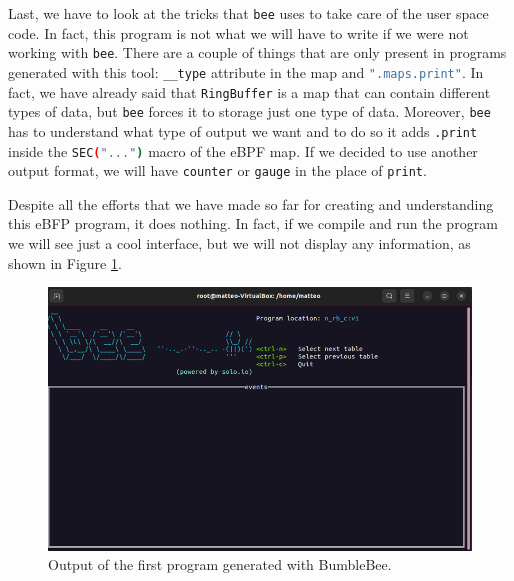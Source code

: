 Last, we have to look at the tricks that \colorbox{backcolour}{\lstinline[style=commandline, language=bash, breaklines=true]|bee|} uses to take care of the user space code.
In fact, this program is not what we will have to write if we were not working with \colorbox{backcolour}{\lstinline[style=commandline, language=bash, breaklines=true]|bee|}.
There are a couple of things that are only present in programs generated with this tool: \colorbox{backcolour}{\lstinline[style=commandline, language=bash, breaklines=true]|__type|} attribute in the map and \colorbox{backcolour}{\lstinline[style=commandline, language=bash, breaklines=true]|".maps.print"|}.
In fact, we have already said that \colorbox{backcolour}{\lstinline[style=commandline, language=bash, breaklines=true]|RingBuffer|} is a map that can contain different types of data, but \colorbox{backcolour}{\lstinline[style=commandline, language=bash, breaklines=true]|bee|} forces it to storage just one type of data.
Moreover, \colorbox{backcolour}{\lstinline[style=commandline, language=bash, breaklines=true]|bee|} has to understand what type of output we want and to do so it adds \colorbox{backcolour}{\lstinline[style=commandline, language=bash, breaklines=true]|.print|} inside the \colorbox{backcolour}{\lstinline[style=commandline, language=bash, breaklines=true]|SEC("...")|} macro of the eBPF map.
If we decided to use another output format, we will have \colorbox{backcolour}{\lstinline[style=commandline, language=bash, breaklines=true]|counter|} or \colorbox{backcolour}{\lstinline[style=commandline, language=bash, breaklines=true]|gauge|} in the place of \colorbox{backcolour}{\lstinline[style=commandline, language=bash, breaklines=true]|print|}.

Despite all the efforts that we have made so far for creating and understanding this eBFP program, it does nothing.
In fact, if we compile and run the program we will see just a cool interface, but we will not display any information, as shown in Figure \ref{fig:bee_first_program_output}.

\begin{figure}[h]
	\centering
	\includegraphics[width=0.7\linewidth]{images/LinuxDevelopment/n_rb_p_display.png}
	\caption{Output of the first program generated with BumbleBee.}
	\label{fig:bee_first_program_output}
\end{figure}

